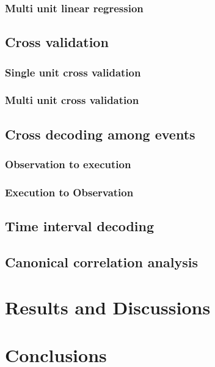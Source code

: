 \documentclass[a4,12pt]{ozu-thesis}
\begin{document}
\subsubsection{Multi unit linear regression}


\subsection{Cross validation}


\subsubsection{Single unit cross validation}

\subsubsection{Multi unit cross validation}

\subsection{Cross decoding among events}

\subsubsection{Observation to execution}

\subsubsection{Execution to Observation}

\subsection{Time interval decoding}


\subsection{Canonical correlation analysis}

\section{Results and Discussions}


\section{Conclusions}
\end{document}

